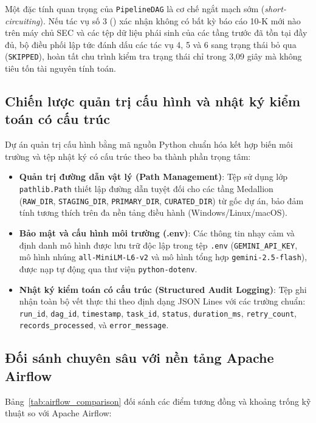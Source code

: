 Một đặc tính quan trọng của \texttt{PipelineDAG} là cơ chế ngắt mạch sớm (\textit{short-circuiting}). Nếu tác vụ số 3 () xác nhận không có bất kỳ báo cáo 10-K mới nào trên máy chủ SEC và các tệp dữ liệu phái sinh của các tầng trước đã tồn tại đầy đủ, bộ điều phối lập tức đánh dấu các tác vụ 4, 5 và 6 sang trạng thái bỏ qua (\texttt{SKIPPED}), hoàn tất chu trình kiểm tra trạng thái chỉ trong 3,09 giây mà không tiêu tốn tài nguyên tính toán.

\subsection{Chiến lược quản trị cấu hình và nhật ký kiểm toán có cấu trúc}
Dự án quản trị cấu hình bằng mã nguồn Python chuẩn hóa kết hợp biến môi trường và tệp nhật ký có cấu trúc theo ba thành phần trọng tâm:
\begin{itemize}
    \item \textbf{Quản trị đường dẫn vật lý (Path Management)}: Tệp  sử dụng lớp \texttt{pathlib.Path} thiết lập đường dẫn tuyệt đối cho các tầng Medallion (\texttt{RAW\_DIR}, \texttt{STAGING\_DIR}, \texttt{PRIMARY\_DIR}, \texttt{CURATED\_DIR}) từ gốc dự án, bảo đảm tính tương thích trên đa nền tảng điều hành (Windows/Linux/macOS).
    \item \textbf{Bảo mật và cấu hình môi trường (.env)}: Các thông tin nhạy cảm và định danh mô hình được lưu trữ độc lập trong tệp \texttt{.env} (\texttt{GEMINI\_API\_KEY}, mô hình nhúng \texttt{all-MiniLM-L6-v2} và mô hình tổng hợp \texttt{gemini-2.5-flash}), được nạp tự động qua thư viện \texttt{python-dotenv}.
    \item \textbf{Nhật ký kiểm toán có cấu trúc (Structured Audit Logging)}: Tệp  ghi nhận toàn bộ vết thực thi theo định dạng JSON Lines với các trường chuẩn: \texttt{run\_id}, \texttt{dag\_id}, \texttt{timestamp}, \texttt{task\_id}, \texttt{status}, \texttt{duration\_ms}, \texttt{retry\_count}, \texttt{records\_processed}, và \texttt{error\_message}.
\end{itemize}

\subsection{Đối sánh chuyên sâu với nền tảng Apache Airflow}
Bảng~\ref{tab:airflow_comparison} đối sánh các điểm tương đồng và khoảng trống kỹ thuật so với Apache Airflow:

